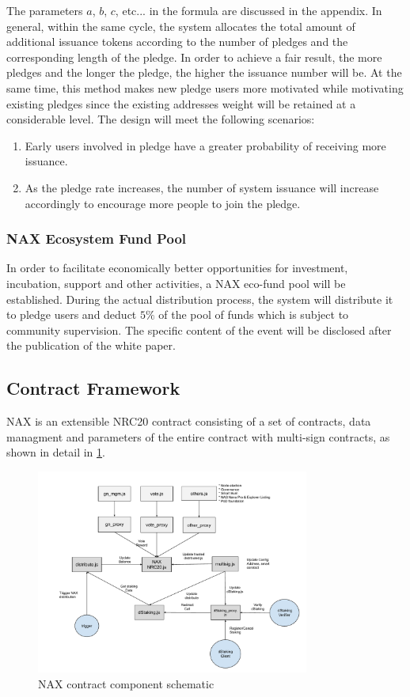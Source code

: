 The parameters $a$, $b$, $c$, etc... in the formula are discussed in the appendix. In general, within the same cycle, the system allocates the total amount of additional issuance tokens according to the number of pledges and the corresponding length of the pledge. In order to achieve a fair result, the more pledges and the longer the pledge, the higher the issuance number will be. At the same time, this method makes new pledge users more motivated while motivating existing pledges since the existing addresses weight will be retained at a considerable level. The design will meet the following scenarios:

\begin{enumerate}[\hspace{1cm}(a)]
  \item Early users involved in pledge have a greater probability of receiving more issuance.
  \item As the pledge rate increases, the number of system issuance will increase accordingly to encourage more people to join the pledge.
\end{enumerate}

\subsubsection{NAX Ecosystem Fund Pool}
In order to facilitate economically better opportunities for investment, incubation, support and other activities, a NAX eco-fund pool will be established. During the actual distribution process, the system will distribute it to pledge users and deduct $5\%$ of the pool of funds which is subject to community supervision. The specific content of the event will be disclosed after the publication of the white paper.

\subsection{Contract Framework}
NAX is an extensible NRC20 contract consisting of a set of contracts, data managment and parameters of the entire contract with multi-sign contracts, as shown in detail in \ref{fig:nax_framework}.

\begin{figure}[h]
  \centering
  \includegraphics[width=0.8\textwidth]{../common/nax.pdf}
  \caption{NAX contract component schematic \label{fig:nax_framework}}
\end{figure}
